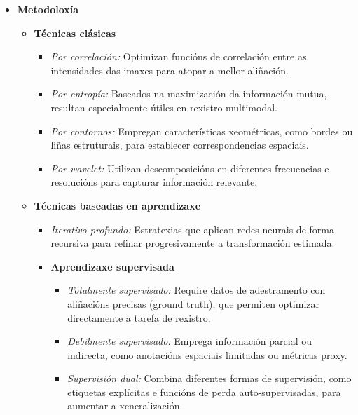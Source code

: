 \begin{itemize}
    \item \textbf{Metodoloxía}
    \begin{itemize}
        \item \textbf{Técnicas clásicas} \cite{zitova2003imageregistrationsurvey}
        \begin{itemize}
            \item \textit{Por correlación:} Optimizan funcións de correlación entre as intensidades das imaxes para atopar a mellor aliñación.
            \item \textit{Por entropía:} Baseados na maximización da información mutua, resultan especialmente útiles en rexistro multimodal.
            \item \textit{Por contornos:} Empregan características xeométricas, como bordes ou liñas estruturais, para establecer correspondencias espaciais.
            \item \textit{Por wavelet:} Utilizan descomposicións en diferentes frecuencias e resolucións para capturar información relevante.
        \end{itemize}
        
        \item \textbf{Técnicas baseadas en aprendizaxe} \cite{deeplernreview3dreg, bharati2022deeplearningmedicalimage}
        \begin{itemize}
            \item \textit{Iterativo profundo:} Estratexias que aplican redes neurais de forma recursiva para refinar progresivamente a transformación estimada.
            
            \item \textbf{Aprendizaxe supervisada}
            \begin{itemize}
                \item \textit{Totalmente supervisado:} Require datos de adestramento con aliñacións precisas (ground truth), que permiten optimizar directamente a tarefa de rexistro.
                \item \textit{Debilmente supervisado:} Emprega información parcial ou indirecta, como anotacións espaciais limitadas ou métricas proxy.
                \item \textit{Supervisión dual:} Combina diferentes formas de supervisión, como etiquetas explícitas e funcións de perda auto-supervisadas, para aumentar a xeneralización.
            \end{itemize}
            

\end{itemize}
\end{itemize}
\end{itemize}

